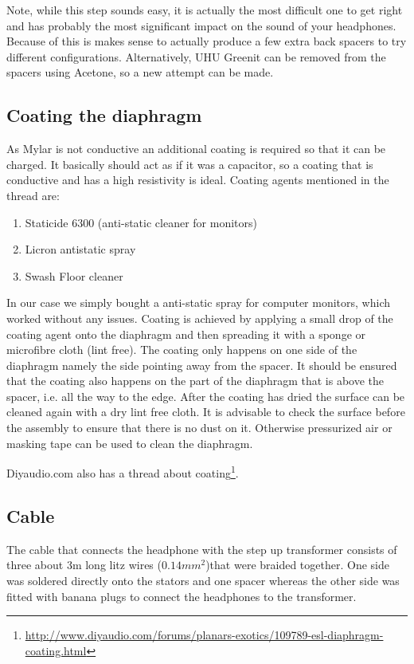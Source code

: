 \documentclass{article}
\begin{document}
Note, while this step sounds easy, it is actually the most difficult one to get right and has probably the most significant impact on the sound of your headphones. Because of this is makes sense to actually produce a few extra back spacers to try different configurations. Alternatively, UHU Greenit can be removed from the spacers using Acetone, so a new attempt can be made.


\subsection{Coating the diaphragm}
As Mylar is not conductive an additional coating is required so that it can be charged. It basically should act as if it was a capacitor, so a coating that is conductive and has a high resistivity is ideal. Coating agents mentioned in the thread are:
\begin{enumerate}
    \item Staticide 6300 (anti-static cleaner for monitors)
    \item Licron antistatic spray
    \item Swash Floor cleaner
\end{enumerate}
In our case we simply bought a anti-static spray for computer monitors, which worked without any issues. Coating is achieved by applying a small drop of the coating agent onto the diaphragm and then spreading it with a sponge or microfibre cloth (lint free). The coating only happens on one side of the diaphragm namely the side pointing away from the spacer. It should be ensured that the coating also happens on the part of the diaphragm that is above the spacer, i.e. all the way to the edge. After the coating has dried the surface can be cleaned again with a dry lint free cloth. It is advisable to check the surface before the assembly to ensure that there is no dust on it. Otherwise pressurized air or masking tape can be used to clean the diaphragm.

Diyaudio.com also has a thread about coating\footnote{\url{http://www.diyaudio.com/forums/planars-exotics/109789-esl-diaphragm-coating.html}}.

\subsection{Cable}
The cable that connects the headphone with the step up transformer consists of three about 3m long litz wires ($0.14mm^2$)that were braided together. One side was soldered directly onto the stators and one spacer whereas the other side was fitted with banana plugs to connect the headphones to the transformer.
\end{document}
